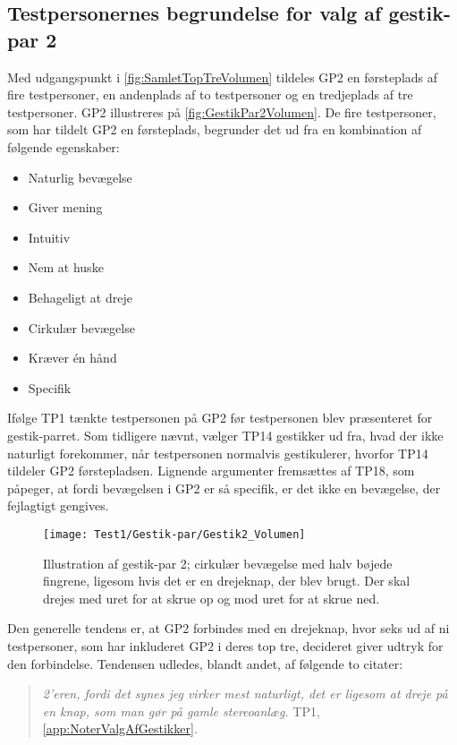 \subsection{Testpersonernes begrundelse for valg af gestik-par 2}
\label{TestresultaterValgAfGestikkerBegrundelseGP2Volumen}
%
Med udgangspunkt i \autoref{fig:SamletTopTreVolumen} tildeles GP2 en førsteplads af fire testpersoner, en andenplads af to testpersoner og en tredjeplads af tre testpersoner. GP2 illustreres på \autoref{fig:GestikPar2Volumen}. De fire testpersoner, som har tildelt GP2 en førsteplads, begrunder det ud fra en kombination af følgende egenskaber: 
%
\begin{multicols}{3}
    \begin{itemize}
        \item Naturlig bevægelse
        \item Giver mening
        \item Intuitiv 
        \item Nem at huske
        \item Behageligt at dreje
        \item Cirkulær bevægelse
        \item Kræver én hånd
        \item Specifik
\end{itemize}
\end{multicols}
\noindent
%
Ifølge TP1 tænkte testpersonen på GP2 før testpersonen blev præsenteret for gestik-parret. Som tidligere nævnt, vælger TP14 gestikker ud fra, hvad der ikke naturligt forekommer, når testpersonen normalvis gestikulerer, hvorfor TP14 tildeler GP2 førstepladsen. Lignende argumenter fremsættes af TP18, som påpeger, at fordi bevægelsen i GP2 er så specifik, er det ikke en bevægelse, der fejlagtigt gengives. 
%
\begin{figure}[H]
	\centering
	\texttt{[image: Test1/Gestik-par/Gestik2\_Volumen]}
	\caption{Illustration af gestik-par 2; cirkulær bevægelse med halv bøjede fingrene, ligesom hvis det er en drejeknap, der blev brugt. Der skal drejes med uret for at skrue op og mod uret for at skrue ned.}
	\label{fig:GestikPar2Volumen}
\end{figure}
\noindent
%
Den generelle tendens er, at GP2 forbindes med en drejeknap, hvor seks ud af ni testpersoner, som har inkluderet GP2 i deres top tre, decideret giver udtryk for den forbindelse. Tendensen udledes, blandt andet, af følgende to citater: 
%
\begin{quotation}
	\noindent
	\textit{2'eren, fordi det synes jeg virker mest naturligt, det er ligesom at dreje på en knap, som man gør på gamle stereoanlæg.} TP1, \autoref{app:NoterValgAfGestikker}.
\noindent
\end{quotation}
